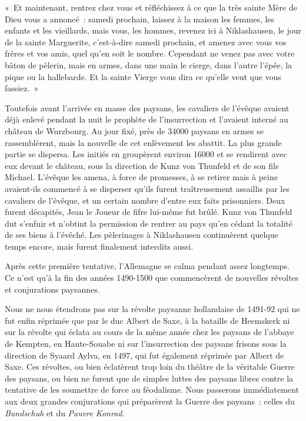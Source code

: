 \documentclass[french,twoside]{book} %
\newenvironment{quoteblock}%
  {\begin{quoting}}
  {\end{quoting}}
\newenvironment{quotebar}{%
    \def\FrameCommand{{\color{rubric!10!}\vrule width 0.5em} \hspace{0.9em}}%
    \def\OuterFrameSep{\itemsep} %
    \MakeFramed {\advance\hsize-\width \FrameRestore}
  }%
  {%
    \endMakeFramed
  }
\renewenvironment{quoteblock}%
  {%
    \savenotes
    \setstretch{0.9}
    \begin{quotebar}
  }
  {%
    \end{quotebar}
    \spewnotes
  }
\begin{document}
\begin{quoteblock}
 \noindent « Et maintenant, rentrez chez vous et réfléchissez à ce que la très sainte Mère de Dieu vous a annoncé : samedi prochain, laissez à la maison les femmes, les enfants et les vieillards, mais vous, les hommes, revenez ici à Niklashausen, le jour de la sainte Marguerite, c’est-à-dire samedi prochain, et amenez avec vous vos frères et vos amis, quel qu’en soit le nombre. Cependant ne venez pas avec votre bâton de pèlerin, mais en armes, dans une main le cierge, dans l’autre l’épée, la pique ou la hallebarde. Et la sainte Vierge vous dira ce qu’elle veut que vous fassiez. »
\end{quoteblock}

\noindent Toutefois avant l’arrivée en masse des paysans, les cavaliers de l’évêque avaient déjà enlevé pendant la nuit le prophète de l’insurrection et l’avaient interné au château de Wurzbourg. Au jour fixé, près de 34000 paysans en armes se rassemblèrent, mais la nouvelle de cet enlèvement les abattit. La plus grande partie se dispersa. Les initiés en groupèrent environ 16000 et se rendirent avec eux devant le château, sous la direction de Kunz von Thunfeld et de son fils Michael. L’évêque les amena, à force de promesses, à se retirer mais à peine avaient-ils commencé à se disperser qu’ils furent traîtreusement assaillis par les cavaliers de l’évêque, et un certain nombre d’entre eux faits prisonniers. Deux furent décapités, Jean le Joueur de fifre lui-même fut brûlé. Kunz von Thunfeld dut s’enfuir et n’obtint la permission de rentrer au pays qu’en cédant la totalité de ses biens à l’évêché. Les pèlerinages à Niklashausen continuèrent quelque temps encore, mais furent finalement interdits aussi.\par
Après cette première tentative, l’Allemagne se calma pendant assez longtemps. Ce n’est qu’à la fin des années 1490-1500 que commencèrent de nouvelles révoltes et conjurations paysannes.\par
Nous ne nous étendrons pas sur la révolte paysanne hollandaise de 1491-92 qui ne fut enfin réprimée que par le duc Albert de Saxe, à la bataille de Heemskerk ni sur la révolte qui éclata au cours de la même année chez les paysans de l’abbaye de Kempten, en Haute-Souabe ni sur l’insurrection des paysans frisons sous la direction de Syaard Aylva, en 1497, qui fut également réprimée par Albert de Saxe. Ces révoltes, ou bien éclatèrent trop loin du théâtre de la véritable Guerre des paysans, ou bien ne furent que de simples luttes des paysans libres contre la tentative de les soumettre de force au féodalisme. Nous passerons immédiatement aux deux grandes conjurations qui préparèrent la Guerre des paysans : celles du \emph{Bundschuh} et du \emph{Pauvre Konrad}.\par
\end{document}

